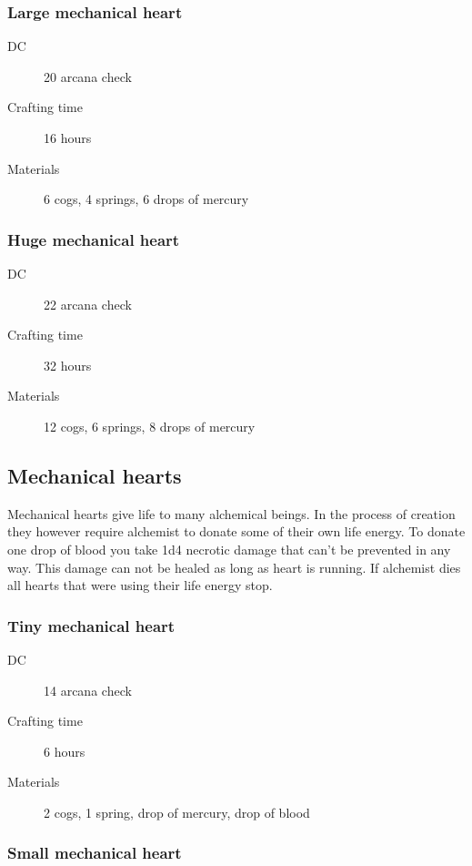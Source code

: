 \subsubsection{Large mechanical heart}

\begin{description}
\item [DC] 20 arcana check
\item [Crafting time] 16 hours
\item [Materials] 6 cogs, 4 springs, 6 drops of mercury
\end{description}

\subsubsection{Huge mechanical heart}

\begin{description}
\item [DC] 22 arcana check
\item [Crafting time] 32 hours
\item [Materials] 12 cogs, 6 springs, 8 drops of mercury
\end{description}

\subsection{Mechanical hearts}

Mechanical hearts give life to many alchemical beings. In the process of creation they however require alchemist to donate some of their own life energy.
To donate one drop of blood you take 1d4 necrotic damage that can't be prevented in any way. This damage can not be healed as long as heart is running. If
alchemist dies all hearts that were using their life energy stop.

\subsubsection{Tiny mechanical heart}

\begin{description}
\item [DC] 14 arcana check
\item [Crafting time] 6 hours
\item [Materials] 2 cogs, 1 spring, drop of mercury, drop of blood
\end{description}

\subsubsection{Small mechanical heart}

